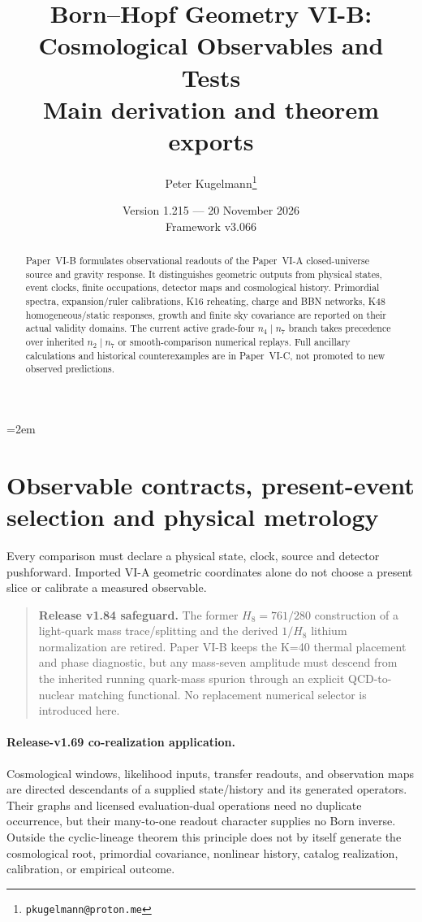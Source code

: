 \documentclass[12pt,a4paper]{article}
\title{\textbf{Born--Hopf Geometry VI-B: Cosmological Observables and Tests}\\[0.5em]\large Main derivation and theorem exports}
\author{Peter Kugelmann\thanks{\texttt{pkugelmann@proton.me}}}
\date{Version 1.215 --- 20 November 2026 \\ Framework v3.066}
\begin{document}
\emergencystretch=2em
\maketitle
\begin{abstract}
Paper~VI-B formulates observational readouts of the Paper~VI-A closed-universe
source and gravity response. It distinguishes geometric outputs from physical
states, event clocks, finite occupations, detector maps and cosmological history.
Primordial spectra, expansion/ruler calibrations, K16 reheating, charge and BBN
networks, K48 homogeneous/static responses, growth and finite sky covariance
are reported on their actual validity domains. The current active grade-four
$n_4\mid n_7$ branch takes precedence over inherited $n_2\mid n_7$ or
smooth-comparison numerical replays. Full ancillary calculations and historical
counterexamples are in Paper~VI-C, not promoted to new observed predictions.
\end{abstract}
\tableofcontents
\clearpage

\section{Observable contracts, present-event selection and physical metrology}
\label{p6b:sec:organized-b1}
Every comparison must declare a physical state, clock, source and detector pushforward. Imported VI-A geometric coordinates alone do not choose a present slice or calibrate a measured observable.


\begin{quote}\textbf{Release v1.84 safeguard.}
The former \(H_8=761/280\) construction of a light-quark mass trace/splitting
and the derived \(1/H_8\) lithium normalization are retired.  Paper VI-B keeps
the K=40 thermal placement and phase diagnostic, but any mass-seven amplitude
must descend from the inherited running quark-mass spurion through an explicit
QCD-to-nuclear matching functional.  No replacement numerical selector is
introduced here.\end{quote}


\paragraph{Release-v1.69 co-realization application.}
Cosmological windows, likelihood inputs, transfer readouts, and observation
maps are directed descendants of a supplied state/history and its generated
operators.  Their graphs and licensed evaluation-dual operations need no
duplicate occurrence, but their many-to-one readout character supplies no
Born inverse.  Outside the cyclic-lineage theorem this principle does not by
itself generate the cosmological root, primordial covariance, nonlinear
history, catalog realization, calibration, or empirical outcome.
\end{document}
